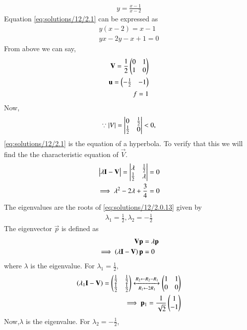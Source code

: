 
\begin{align}
y=\frac{x-1}{x-2}\label{eq:solutions/12/2.1}
\end{align}
Equation \eqref{eq:solutions/12/2.1} can be expressed as
\begin{align}
y(x-2)=x-1\\
yx-2y-x+1=0\label{eq:solutions/12/2.0.3}
\end{align}
From above we can say,
\begin{align}
\mathbf{V}=\frac{1}{2}\begin{pmatrix}0 & 1\\ 1 & 0\end{pmatrix}\\
\mathbf{u}=\begin{pmatrix}-\frac{1}{2}&-1\end{pmatrix}\\
f=1
\end{align}
Now,
\begin{align}
\because \left\vert V\right\vert = \begin{vmatrix}0& \frac{1}{2} \\ \frac{1}{2} & 0\end{vmatrix} < 0,
\end{align}
\eqref{eq:solutions/12/2.1} is the equation of a hyperbola. To verify that this we will find the the characteristic equation of $\vec{V}$.
\begin{align}
\begin{vmatrix}\lambda \mathbf{I}-\mathbf{V}\end{vmatrix} = \begin{vmatrix}\lambda  & \frac{1}{2}\\ \frac{1}{2} & \lambda \end{vmatrix} &= 0
\\
\implies \lambda^2 - 2\lambda + \frac{3}{4} &= 0
\label{eq:solutions/12/2.0.13}
\end{align}
The eigenvalues are the roots of \eqref{eq:solutions/12/2.0.13} given by
\begin{align}
\lambda_1 = \frac{1}{2}, \lambda_2 = -\frac{1}{2}
\label{eq:solutions/12/2.0.14}
\end{align}
The eigenvector $\vec{p}$ is defined as
\begin{align}
\mathbf{V} \mathbf{p}&= \lambda \mathbf{p}
\\
\implies \left(\lambda\mathbf{I}-\mathbf{V}\right)\mathbf{p} &=0
\end{align}
where $\lambda$ is the eigenvalue.  For $\lambda_1 = \frac{1}{2}$,
\begin{align}
\left(\lambda_1\mathbf{I}-\mathbf{V}\right)
= \begin{pmatrix}\frac{1}{2} & \frac{1}{2}
\\ \frac{1}{2} & \frac{1}{2}\end{pmatrix} 
\xleftrightarrow[R_1 \leftarrow 2R_1] {R_2\leftarrow R_2-R_1}\begin{pmatrix}1 & 1 \\0 & 0 \end{pmatrix}  
\\
\implies \mathbf{p}_1 = \frac{1}{\sqrt{2}}\begin{pmatrix}1 \\- 1\end{pmatrix}
\end{align}
Now,$\lambda$ is the eigenvalue.  For $\lambda_2 = -\frac{1}{2}$,
